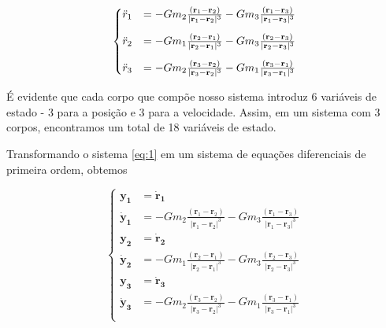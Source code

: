 \documentclass[a4paper, 12pt]{article} %
\begin{document}
\begin{equation}\label{eq:1}
    \begin{cases}
      \Ddot{r}_1 &= -{Gm_2} \frac{(\mathbf{r}_1 - \mathbf{r}_2)}{|\mathbf{r}_1 - \mathbf{r}_2|^3} -{Gm_3} \frac{(\mathbf{r}_1 - \mathbf{r}_3)}{|\mathbf{r}_1 - \mathbf{r}_3|^3} \\[10pt]

      \Ddot{r}_2 &= -{Gm_1} \frac{(\mathbf{r}_2 - \mathbf{r}_1)}{|\mathbf{r}_2 - \mathbf{r}_1|^3} -{Gm_3} \frac{(\mathbf{r}_2 - \mathbf{r}_3)}{|\mathbf{r}_2 - \mathbf{r}_3|^3} \\[10pt]
      
      \Ddot{r}_3 &= -{Gm_2} \frac{(\mathbf{r}_3 - \mathbf{r}_2)}{|\mathbf{r}_3 - \mathbf{r}_2|^3} -{Gm_1} \frac{(\mathbf{r}_3 - \mathbf{r}_1)}{|\mathbf{r}_3 - \mathbf{r}_1|^3} \\
    \end{cases}
\end{equation} 

É evidente que cada corpo que compõe nosso sistema introduz 6 variáveis de estado - 3 para a posição e 3 para a velocidade. Assim, em um sistema com 3 corpos, encontramos um total de 18 variáveis de estado.

Transformando o sistema \eqref{eq:1} em um sistema de equações diferenciais de primeira ordem, obtemos

\begin{equation}\label{eq:primeiraOrdem}
    \begin{cases}
      \mathbf{{y_1}} &= \mathbf{\dot{r}_1}  \\
        
      \mathbf{\dot{y}_1} &= -{Gm_2} \frac{(\mathbf{r}_1 - \mathbf{r}_2)}{|\mathbf{r}_1 - \mathbf{r}_2|^3} -{Gm_3} \frac{(\mathbf{r}_1 - \mathbf{r}_3)}{|\mathbf{r}_1 - \mathbf{r}_3|^3} \\[10pt]

      \mathbf{{y}_2} &= \mathbf{\dot{r}_2} \\
      
      \mathbf{\dot{y}_2} &= -{Gm_1} \frac{(\mathbf{r}_2 - \mathbf{r}_1)}{|\mathbf{r}_2 - \mathbf{r}_1|^3} -{Gm_3} \frac{(\mathbf{r}_2 - \mathbf{r}_3)}{|\mathbf{r}_2 - \mathbf{r}_3|^3} \\[10pt]

      \mathbf{{y}_3} &= \mathbf{\dot{r}_3} \\
      \mathbf{\dot{y}_3} &= -{Gm_2} \frac{(\mathbf{r}_3 - \mathbf{r}_2)}{|\mathbf{r}_3 - \mathbf{r}_2|^3} -{Gm_1} \frac{(\mathbf{r}_3 - \mathbf{r}_1)}{|\mathbf{r}_3 - \mathbf{r}_1|^3} \\
    \end{cases}
\end{equation} \\
\end{document}
